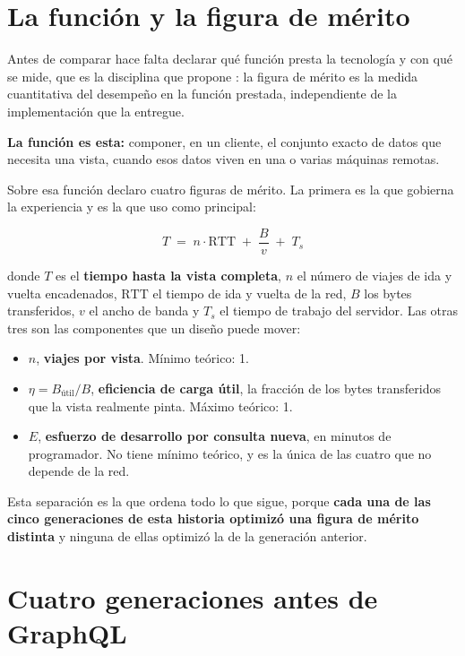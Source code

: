 \documentclass[11pt,letterpaper]{article}
\begin{document}
\section{La función y la figura de mérito}

Antes de comparar hace falta declarar qué función presta la tecnología y con
qué se mide, que es la disciplina que propone \textcite{deweck2022}: la figura
de mérito es la medida cuantitativa del desempeño en la función prestada,
independiente de la implementación que la entregue.

\textbf{La función es esta:} componer, en un cliente, el conjunto exacto de
datos que necesita una vista, cuando esos datos viven en una o varias máquinas
remotas.

Sobre esa función declaro cuatro figuras de mérito. La primera es la que
gobierna la experiencia y es la que uso como principal:

\begin{equation}
T \;=\; n \cdot \mathrm{RTT} \;+\; \frac{B}{v} \;+\; T_{s}
\label{eq:fom}
\end{equation}

donde $T$ es el \textbf{tiempo hasta la vista completa}, $n$ el número de
viajes de ida y vuelta encadenados, $\mathrm{RTT}$ el tiempo de ida y vuelta de
la red, $B$ los bytes transferidos, $v$ el ancho de banda y $T_{s}$ el tiempo
de trabajo del servidor. Las otras tres son las componentes que un diseño
puede mover:

\begin{itemize}
\item $n$, \textbf{viajes por vista}. Mínimo teórico: 1.
\item $\eta = B_{\text{útil}} / B$, \textbf{eficiencia de carga útil}, la
  fracción de los bytes transferidos que la vista realmente pinta. Máximo
  teórico: 1.
\item $E$, \textbf{esfuerzo de desarrollo por consulta nueva}, en minutos de
  programador. No tiene mínimo teórico, y es la única de las cuatro que no
  depende de la red.
\end{itemize}

Esta separación es la que ordena todo lo que sigue, porque \textbf{cada una de
las cinco generaciones de esta historia optimizó una figura de mérito distinta}
y ninguna de ellas optimizó la de la generación anterior.

\section{Cuatro generaciones antes de GraphQL}
\end{document}
